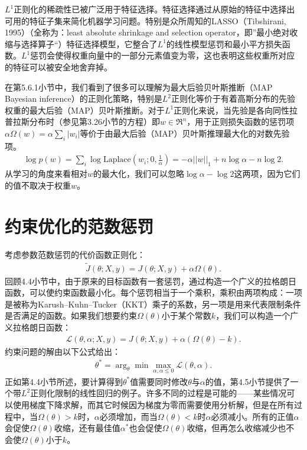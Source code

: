 $L^1$正则化的稀疏性已被广泛用于特征选择。特征选择通过从原始的特征中选择出可用的特征子集来简化机器学习问题。特别是众所周知的LASSO（Tibshirani, 1995）（全称为：least absolute shrinkage and selection operator，即”最小绝对收缩与选择算子“）特征选择模型，它整合了$L^1$的线性模型惩罚和最小平方损失函数。$L^1$惩罚会使得权重向量中的一部分元素值变为零，这也表明这些权重所对应的特征可以被安全地舍弃掉。

在第5.6.1小节中，我们看到了很多可以理解为最大后验贝叶斯推断（MAP Bayesian inference）的正则化策略，特别是$L^2$正则化等价于有着高斯分布的先验权重的最大后验（MAP）贝叶斯推断。对于$L^1$正则化来说，当先验是各向同性拉普拉斯分布时（参见第3.26小节的方程）即$w \in \Re^n$，用于正则损失函数的惩罚项$\alpha \Omega (w) = \alpha \sum_i |w_i|$等价于由最大后验（MAP）贝叶斯推理最大化的对数先验项。
$$
\begin{aligned}
\log p(w) = \sum_i \log \text{Laplace}(w_i;0,\frac{1}{\alpha}) = -\alpha ||w||_1 + n \log \alpha - n \log2.
\end{aligned}
$$
从学习的角度来看相对$w$的最大化，我们可以忽略$\log \alpha - \log 2$这两项，因为它们的值不取决于权重$w$。

\section{约束优化的范数惩罚}

考虑参数范数惩罚的代价函数正则化：
$$
\begin{aligned}
	\widetilde{J}(\theta; X, y) = J(\theta; X, y) + \alpha \Omega(\theta).
\end{aligned}
$$
回顾4.4小节中，由于原来的目标函数有一套惩罚，通过构造一个广义的拉格朗日函数，可以使约束函数最小化。每个惩罚相当于一个乘积，乘积由两项构成：一项是被称为Karush–Kuhn–Tucker（KKT）乘子的系数，另一项是用来代表限制条件是否满足的函数。如果我们想要约束$\Omega(\theta)$小于某个常数$k$，我们可以构造一个广义拉格朗日函数：
$$
\begin{aligned}
	\mathcal{L} (\theta, \alpha; X, y) = J(\theta; X, y) + \alpha (\Omega(\theta) - k).
\end{aligned}
$$
约束问题的解由以下公式给出：
$$
\begin{aligned}
	\theta^* = \arg_{\theta} \min \max_{\alpha,\alpha \leq 0} \mathcal{L}(\theta, \alpha).
\end{aligned}
$$
正如第4.4小节所述，要计算得到$\theta^*$值需要同时修改$\theta$与$\alpha$的值，第4.5小节提供了一个带$L^2$正则化限制的线性回归的例子。许多不同的过程是可能的——某些情况可以使用梯度下降求解，而其它时候因为梯度为零而需要使用分析解，但是在所有过程中，当$\Omega (\theta) > k$时，$\alpha$必须增加，而当$\Omega (\theta) < k$时$\alpha$必须减小。所有的正值$\alpha$会促使$\Omega (\theta)$收缩，还有最佳值$\alpha^*$也会促使$\Omega (\theta)$收缩，但再怎么收缩减少也不会使$\Omega (\theta)$小于$k$。


